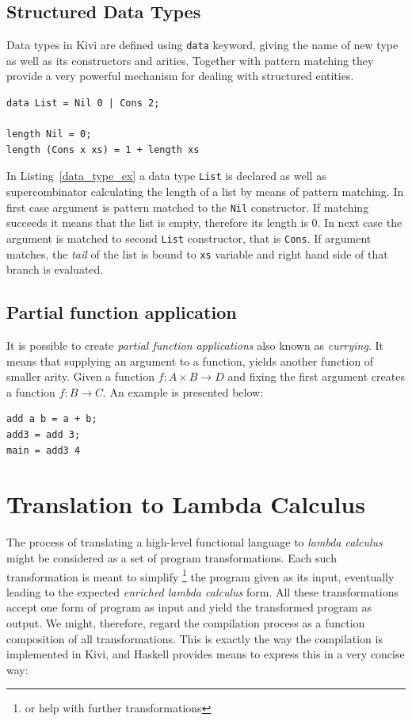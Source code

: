 \documentclass[12pt,a4paper]{report}
\begin{document}
\subsection{Structured Data Types}
Data types in Kivi are defined using \texttt{data} keyword, giving the name of
new type as well as its constructors and arities. Together with pattern matching they
provide a very powerful mechanism for dealing with structured entities.

\vspace*{0.2in}
\begin{lstlisting}[style=haskell,label=data_type_ex,caption={Calculating length of list.}]
data List = Nil 0 | Cons 2;

length Nil = 0;
length (Cons x xs) = 1 + length xs
\end{lstlisting}

In Listing~\ref{data_type_ex} a data type \texttt{List} is declared as well as
supercombinator calculating the length of a list by means of pattern matching.
In first case argument is pattern matched to the \texttt{Nil} constructor. If
matching succeeds it means that the list is empty, therefore its length is 0.
In next case the argument is matched to second \texttt{List} constructor, that
is \texttt{Cons}. If argument matches, the \textit{tail} of the list is bound to
\texttt{xs} variable and right hand side of that branch is evaluated.

\subsection{Partial function application}
It is possible to create \textit{partial function applications} also known as
\textit{currying}. It means that supplying an argument to a function, yields
another function of smaller arity. Given a function $f : A \times B \rightarrow
D$ and fixing the first argument creates a function $f : B \rightarrow C$. An
example is presented below:

\vspace*{0.2in}
\begin{lstlisting}[style=haskell,caption={Partial application of addition.}]
add a b = a + b;
add3 = add 3;
main = add3 4
\end{lstlisting}

\section{Translation to Lambda Calculus}
The process of translating a high-level functional language to \textit{lambda
calculus} might be considered as a set of program transformations. Each such
transformation is meant to simplify \footnote{or help with further
transformations} the program given as its input, eventually leading to the
expected \textit{enriched lambda calculus} form. All these transformations
accept one form of program as input and yield the transformed program as
output. We might, therefore, regard the compilation process as a function
composition of all transformations. This is exactly the way the compilation is
implemented in Kivi, and Haskell provides means to express this in a very
concise way:
\end{document}
